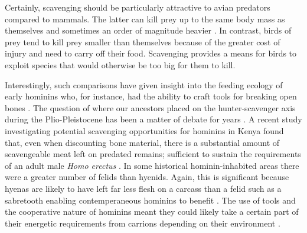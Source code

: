 \documentclass[a4paper,12pt]{article}
\begin{document}
Certainly, scavenging should be particularly attractive to avian predators compared to mammals. %
The latter can kill prey up to the same body mass as themselves and sometimes an order of magnitude heavier \citep[e.g. socially hunting lions; ][]{owen2008predator}.
In contrast, birds of prey tend to kill prey smaller than themselves \citep{slagsvold2007prey} because of the greater cost of injury and need to carry off their food.
Scavenging provides a means for birds to exploit species that would otherwise be too big for them to kill.




Interestingly, such comparisons have given insight into the feeding ecology of early hominins who, for instance, had the ability to craft tools for breaking open bones \citep{ARCM:ARCM12084}.
The question of where our ancestors placed on the hunter-scavenger axis during the Plio-Pleistocene has been a matter of debate for years \citep{dominguez2002hunting}.
A recent study investigating potential scavenging opportunities for hominins in Kenya found that, even when discounting bone material, there is a substantial amount of scavengeable %
meat left on predated remains; sufficient to sustain the requirements of an adult male \textit{Homo erectus} \citep{pobiner2015new}.
In some historical hominin-inhabited areas there were a greater number of felids than hyenids.
Again, this is significant because hyenas are likely to have left far less flesh on a carcass than a felid such as a sabretooth enabling contemperaneous hominins to benefit \citep{pobiner2015new}.
The use of tools and the cooperative nature of hominins meant they could likely take a certain part of their energetic requirements from carrions depending on their environment \citep{moleon2014humans}. %
\end{document}

